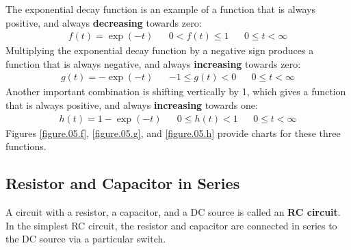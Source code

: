 The exponential decay function is an example of a function that is always positive, and always \textbf{decreasing} towards zero:
\begin{align}
    f(t) = \exp(-t) && 0 < f(t) \leq 1 && 0 \leq t < \infty
\end{align}
Multiplying the exponential decay function by a negative sign produces a function that is always negative, and always \textbf{increasing} towards zero:
\begin{align}
    g(t) = -\exp(-t) && -1 \leq g(t) < 0 && 0 \leq t < \infty
\end{align}
Another important combination is shifting vertically by 1, which gives a function that is always positive, and always \textbf{increasing} towards one:
\begin{align}
    h(t) = 1 - \exp(-t) && 0 \leq h(t) < 1 && 0 \leq t < \infty
\end{align}
Figures \ref{figure.05.f}, \ref{figure.05.g}, and \ref{figure.05.h} provide charts for these three functions.
\subsection{Resistor and Capacitor in Series}
A circuit with a resistor, a capacitor, and a DC source is called an \textbf{RC circuit}. In the simplest RC circuit, the resistor and capacitor are connected in series to the DC source via a particular switch.
